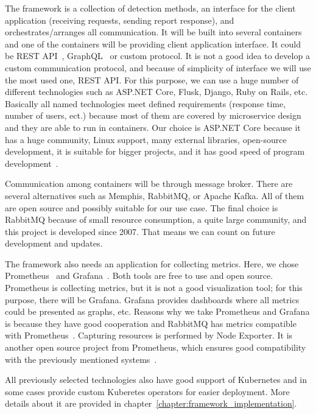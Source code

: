 The framework is a collection of detection methods, an interface for the client application (receiving requests, sending report response), and orchestrates/arranges all communication. It will be built into several containers and one of the containers will be providing client application interface. It could be REST API~\cite{RestAPI}, GraphQL~\cite{GraphQL} or custom protocol. It is not a good idea to develop a custom communication protocol, and because of simplicity of interface we will use the most used one, REST API. For this purpose, we can use a huge number of different technologies such as ASP.NET Core, Flusk, Django, Ruby on Rails, etc. Basically all named technologies meet defined requirements (response time, number of users, ect.) because most of them are covered by microservice design and they are able to run in containers. Our choice is ASP.NET Core because it has a huge community, Linux support, many external libraries, open-source development, it is suitable for bigger projects, and it has good speed of program development~\cite{ASPNETCore}.

Communication among containers will be through message broker. There are several alternatives such as Memphis, RabbitMQ, or Apache Kafka. All of them are open source and possibly suitable for our use case. The final choice is RabbitMQ because of small resource consumption, a quite large community, and this project is developed since 2007. That means we can count on future development and updates.~\cite{MessageBrokers}

The framework also needs an application for collecting metrics. Here, we chose Prome\-theus~\cite{Prometheus} and Grafana~\cite{Grafana}. Both tools are free to use and open source. Prometheus is collecting metrics, but it is not a good visualization tool; for this purpose, there will be Grafana. Grafana provides dashboards where all metrics could be presented as graphs, etc. Reasons why we take Prometheus and Grafana is because they have good cooperation and RabbitMQ has metrics compatible with Prometheus~\cite{RabbitMQMonitoring}. Capturing resources is performed by Node Exporter. It is another open source project from Prometheus, which ensures good compatibility with the previously mentioned systems~\cite{NodeExporter}.

All previously selected technologies also have good support of Kubernetes and in some cases provide custom Kuberetes operators for easier deployment. More details about it are provided in chapter~\ref{chapter:framework_implementation}.

